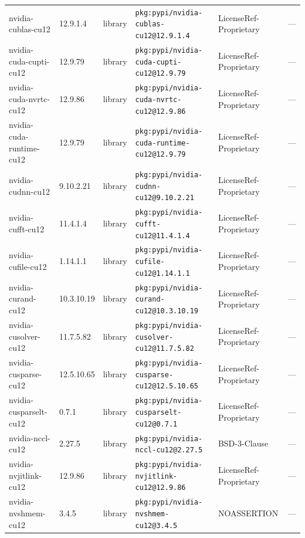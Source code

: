 \documentclass[11pt,a4paper]{article}
\begin{document}
\begin{longtable}{|p{4cm}|p{2cm}|p{1.6cm}|p{5cm}|p{1.5cm}|p{3.5cm}|}
\raggedright nvidia-cublas-cu12 & 12.9.1.4 & library & \small\texttt{pkg:pypi/nvidia-cublas-cu12@12.9.1.4} & LicenseRef-Proprietary & \small — \\
\raggedright nvidia-cuda-cupti-cu12 & 12.9.79 & library & \small\texttt{pkg:pypi/nvidia-cuda-cupti-cu12@12.9.79} & LicenseRef-Proprietary & \small — \\
\raggedright nvidia-cuda-nvrtc-cu12 & 12.9.86 & library & \small\texttt{pkg:pypi/nvidia-cuda-nvrtc-cu12@12.9.86} & LicenseRef-Proprietary & \small — \\
\raggedright nvidia-cuda-runtime-cu12 & 12.9.79 & library & \small\texttt{pkg:pypi/nvidia-cuda-runtime-cu12@12.9.79} & LicenseRef-Proprietary & \small — \\
\raggedright nvidia-cudnn-cu12 & 9.10.2.21 & library & \small\texttt{pkg:pypi/nvidia-cudnn-cu12@9.10.2.21} & LicenseRef-Proprietary & \small — \\
\raggedright nvidia-cufft-cu12 & 11.4.1.4 & library & \small\texttt{pkg:pypi/nvidia-cufft-cu12@11.4.1.4} & LicenseRef-Proprietary & \small — \\
\raggedright nvidia-cufile-cu12 & 1.14.1.1 & library & \small\texttt{pkg:pypi/nvidia-cufile-cu12@1.14.1.1} & LicenseRef-Proprietary & \small — \\
\raggedright nvidia-curand-cu12 & 10.3.10.19 & library & \small\texttt{pkg:pypi/nvidia-curand-cu12@10.3.10.19} & LicenseRef-Proprietary & \small — \\
\raggedright nvidia-cusolver-cu12 & 11.7.5.82 & library & \small\texttt{pkg:pypi/nvidia-cusolver-cu12@11.7.5.82} & LicenseRef-Proprietary & \small — \\
\raggedright nvidia-cusparse-cu12 & 12.5.10.65 & library & \small\texttt{pkg:pypi/nvidia-cusparse-cu12@12.5.10.65} & LicenseRef-Proprietary & \small — \\
\raggedright nvidia-cusparselt-cu12 & 0.7.1 & library & \small\texttt{pkg:pypi/nvidia-cusparselt-cu12@0.7.1} & LicenseRef-Proprietary & \small — \\
\raggedright nvidia-nccl-cu12 & 2.27.5 & library & \small\texttt{pkg:pypi/nvidia-nccl-cu12@2.27.5} & BSD-3-Clause & \small — \\
\raggedright nvidia-nvjitlink-cu12 & 12.9.86 & library & \small\texttt{pkg:pypi/nvidia-nvjitlink-cu12@12.9.86} & LicenseRef-Proprietary & \small — \\
\raggedright nvidia-nvshmem-cu12 & 3.4.5 & library & \small\texttt{pkg:pypi/nvidia-nvshmem-cu12@3.4.5} & NOASSERTION & \small — \\

\end{longtable}
\end{document}

